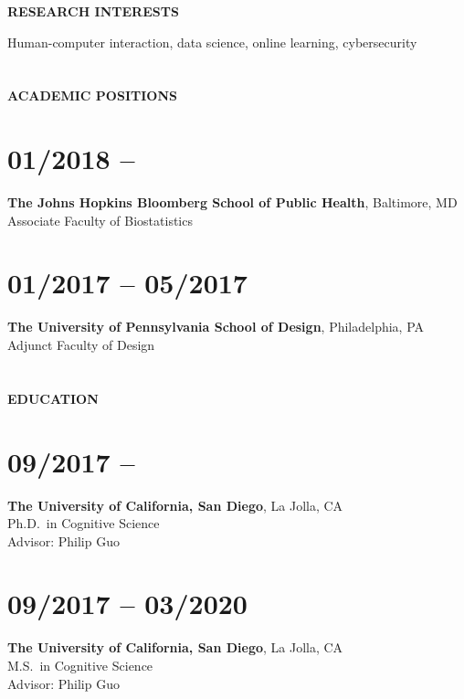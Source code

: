 \textbf{RESEARCH INTERESTS}
\vspace{0.05in}

Human-computer interaction, data science, online learning, cybersecurity

\section{} \vspace{0.125in} \textbf{ACADEMIC POSITIONS} \vspace{-0.5em}

\section{01/2018 --}
\textbf{The Johns Hopkins Bloomberg School of Public Health}, Baltimore, MD \\
Associate Faculty of Biostatistics

\section{01/2017 -- 05/2017}
\textbf{The University of Pennsylvania School of Design}, Philadelphia, PA \\
Adjunct Faculty of Design

\section{} \vspace{0.1in} \textbf{EDUCATION} \vspace{-0.5em}

\section{09/2017 --}

\textbf{The University of California, San Diego}, La Jolla, CA \\
Ph.D.\ in Cognitive Science \\
Advisor: Philip Guo %

\section{09/2017 -- 03/2020}

\textbf{The University of California, San Diego}, La Jolla, CA \\
M.S.\ in Cognitive Science \\
Advisor: Philip Guo

